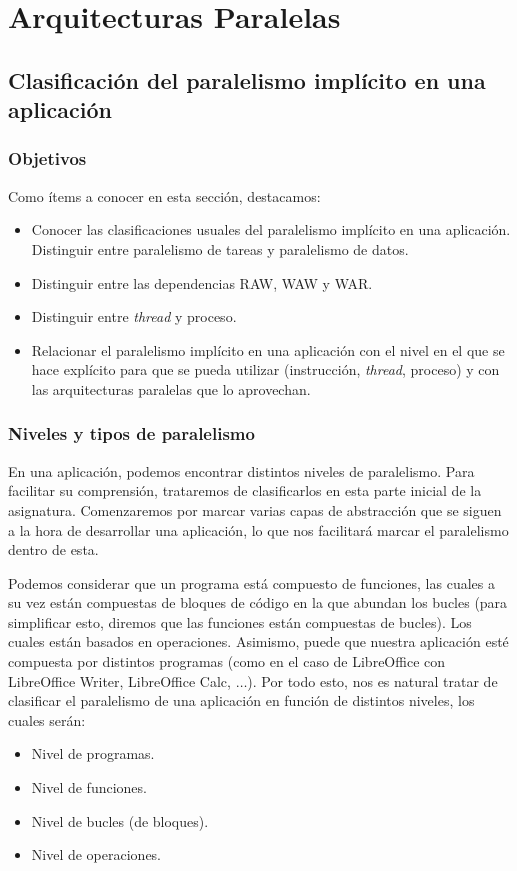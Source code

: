 \chapter{Arquitecturas Paralelas}

\section{Clasificación del paralelismo implícito en una aplicación}
\subsection{Objetivos}
Como ítems a conocer en esta sección, destacamos:
\begin{itemize}
    \item Conocer las clasificaciones usuales del paralelismo implícito en una aplicación. Distinguir entre paralelismo de tareas y paralelismo de datos.
    \item Distinguir entre las dependencias RAW, WAW y WAR.
    \item Distinguir entre \emph{thread} y proceso.
    \item Relacionar el paralelismo implícito en una aplicación con el nivel en el que se hace explícito para que se pueda utilizar (instrucción, \emph{thread}, proceso) y con las arquitecturas paralelas que lo aprovechan.
\end{itemize}

\subsection{Niveles y tipos de paralelismo}
En una aplicación, podemos encontrar distintos niveles de paralelismo. Para facilitar su comprensión, trataremos de clasificarlos en esta parte inicial de la asignatura. Comenzaremos por marcar varias capas de abstracción que se siguen a la hora de desarrollar una aplicación, lo que nos facilitará marcar el paralelismo dentro de esta.

Podemos considerar que un programa está compuesto de funciones, las cuales a su vez están compuestas de bloques de código en la que abundan los bucles (para simplificar esto, diremos que las funciones están compuestas de bucles). Los cuales están basados en operaciones. Asimismo, puede que nuestra aplicación esté compuesta por distintos programas (como en el caso de LibreOffice con LibreOffice Writer, LibreOffice Calc, $\ldots$). Por todo esto, nos es natural tratar de clasificar el paralelismo de una aplicación en función de distintos niveles, los cuales serán:
\begin{itemize}
    \item Nivel de programas.
    \item Nivel de funciones.
    \item Nivel de bucles (de bloques).
    \item Nivel de operaciones.
\end{itemize}

